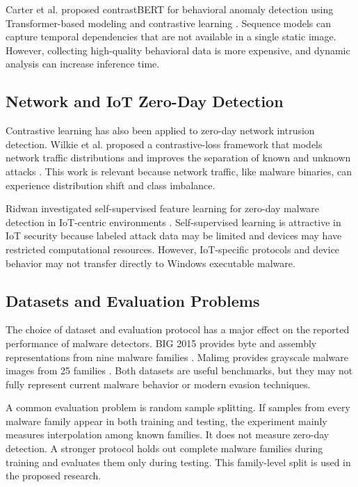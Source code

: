 \documentclass[12pt,a4paper]{article}
\begin{document}
Carter et al. proposed contrastBERT for behavioral anomaly detection using Transformer-based modeling and contrastive learning \citep{carter2025}. Sequence models can capture temporal dependencies that are not available in a single static image. However, collecting high-quality behavioral data is more expensive, and dynamic analysis can increase inference time.

\subsection{Network and IoT Zero-Day Detection}

Contrastive learning has also been applied to zero-day network intrusion detection. Wilkie et al. proposed a contrastive-loss framework that models network traffic distributions and improves the separation of known and unknown attacks \citep{wilkie2026}. This work is relevant because network traffic, like malware binaries, can experience distribution shift and class imbalance.

Ridwan investigated self-supervised feature learning for zero-day malware detection in IoT-centric environments \citep{ridwan2026}. Self-supervised learning is attractive in IoT security because labeled attack data may be limited and devices may have restricted computational resources. However, IoT-specific protocols and device behavior may not transfer directly to Windows executable malware.

\subsection{Datasets and Evaluation Problems}

The choice of dataset and evaluation protocol has a major effect on the reported performance of malware detectors. BIG 2015 provides byte and assembly representations from nine malware families \citep{microsoft2015}. Malimg provides grayscale malware images from 25 families \citep{nataraj2011}. Both datasets are useful benchmarks, but they may not fully represent current malware behavior or modern evasion techniques.

A common evaluation problem is random sample splitting. If samples from every malware family appear in both training and testing, the experiment mainly measures interpolation among known families. It does not measure zero-day detection. A stronger protocol holds out complete malware families during training and evaluates them only during testing. This family-level split is used in the proposed research.
\end{document}
